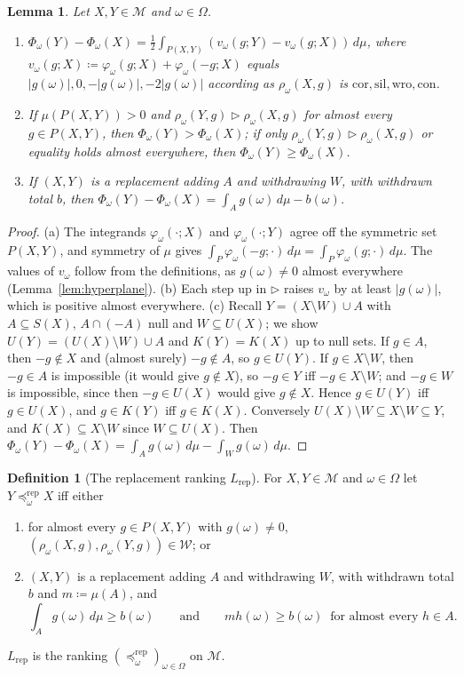 \documentclass[11pt]{article}
\newtheorem{lemma}[theorem]{Lemma}
\theoremstyle{definition}
\newtheorem{definition}[theorem]{Definition}
\theoremstyle{remark}
\newcommand{\M}{\mathcal M}
\newcommand{\cor}{\mathrm{cor}}
\newcommand{\sil}{\mathrm{sil}}
\newcommand{\wro}{\mathrm{wro}}
\newcommand{\con}{\mathrm{con}}
\newcommand{\Lrep}{L_{\mathrm{rep}}}
\newcommand{\prep}{\preceq^{\mathrm{rep}}}
\begin{document}
\begin{lemma}\label{lem:Phi}
Let $X,Y\in\M$ and $\omega\in\Omega$.
\begin{enumerate}[label=(\alph*)]
\item $\Phi_\omega(Y)-\Phi_\omega(X)=\frac12\int_{P(X,Y)}(v_\omega(g;Y)-v_\omega(g;X))\,d\mu$, where $v_\omega(g;X)\coloneqq\varphi_\omega(g;X)+\varphi_\omega(-g;X)$ equals $|g(\omega)|,0,-|g(\omega)|,-2|g(\omega)|$ according as $\rho_\omega(X,g)$ is $\cor,\sil,\wro,\con$.
\item If $\mu(P(X,Y))>0$ and $\rho_\omega(Y,g)\rhd\rho_\omega(X,g)$ for almost every $g\in P(X,Y)$, then $\Phi_\omega(Y)>\Phi_\omega(X)$; if only $\rho_\omega(Y,g)\rhd\rho_\omega(X,g)$ or equality holds almost everywhere, then $\Phi_\omega(Y)\ge\Phi_\omega(X)$.
\item If $(X,Y)$ is a replacement adding $A$ and withdrawing $W$, with withdrawn total $b$, then $\Phi_\omega(Y)-\Phi_\omega(X)=\int_Ag(\omega)\,d\mu-b(\omega)$.
\end{enumerate}
\end{lemma}
\begin{proof}
(a) The integrands $\varphi_\omega(\cdot;X)$ and $\varphi_\omega(\cdot;Y)$ agree off the symmetric set $P(X,Y)$, and symmetry of $\mu$ gives $\int_P\varphi_\omega(-g;\cdot)\,d\mu=\int_P\varphi_\omega(g;\cdot)\,d\mu$. The values of $v_\omega$ follow from the definitions, as $g(\omega)\ne0$ almost everywhere (Lemma~\ref{lem:hyperplane}). (b) Each step up in $\rhd$ raises $v_\omega$ by at least $|g(\omega)|$, which is positive almost everywhere. (c) Recall $Y=(X\setminus W)\cup A$ with $A\subseteq S(X)$, $A\cap(-A)$ null and $W\subseteq U(X)$; we show $U(Y)=(U(X)\setminus W)\cup A$ and $K(Y)=K(X)$ up to null sets. If $g\in A$, then $-g\notin X$ and (almost surely) $-g\notin A$, so $g\in U(Y)$. If $g\in X\setminus W$, then $-g\in A$ is impossible (it would give $g\notin X$), so $-g\in Y$ iff $-g\in X\setminus W$; and $-g\in W$ is impossible, since then $-g\in U(X)$ would give $g\notin X$. Hence $g\in U(Y)$ iff $g\in U(X)$, and $g\in K(Y)$ iff $g\in K(X)$. Conversely $U(X)\setminus W\subseteq X\setminus W\subseteq Y$, and $K(X)\subseteq X\setminus W$ since $W\subseteq U(X)$. Then $\Phi_\omega(Y)-\Phi_\omega(X)=\int_Ag(\omega)\,d\mu-\int_Wg(\omega)\,d\mu$.
\end{proof}

\begin{definition}[The replacement ranking $\Lrep$]\label{def:Lrep}
For $X,Y\in\M$ and $\omega\in\Omega$ let $Y\prep_\omega X$ iff either
\begin{enumerate}[label=(L\alph*)]
\item\label{La} for almost every $g\in P(X,Y)$ with $g(\omega)\ne0$, $(\rho_\omega(X,g),\rho_\omega(Y,g))\in\mathcal W$; or
\item\label{Lb} $(X,Y)$ is a replacement adding $A$ and withdrawing $W$, with withdrawn total $b$ and $m\coloneqq\mu(A)$, and
\[
\int_Ag(\omega)\,d\mu\ge b(\omega)\qquad\text{and}\qquad mh(\omega)\ge b(\omega)\ \text{ for almost every }h\in A .
\]
\end{enumerate}
$\Lrep$ is the ranking $(\prep_\omega)_{\omega\in\Omega}$ on $\M$.
\end{definition}
\end{document}
